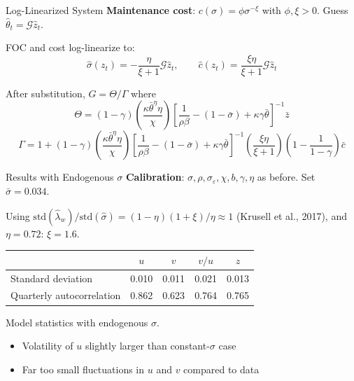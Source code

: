 \documentclass[blue]{beamer}
\begin{document}
\begin{frame}{Log-Linearized System}
	\textbf{Maintenance cost}: $c(\sigma) = \phi \sigma^{-\xi}$ with $\phi, \xi > 0$. Guess $\hat\theta_t = \mathcal{G} \hat{z}_t$.
	
	\medskip
	FOC and cost log-linearize to:
	\[
	\hat\sigma(z_t) = -\frac{\eta}{\xi + 1}\mathcal{G} \hat{z}_t, \qquad \hat{c}(z_t) = \frac{\xi \eta}{\xi + 1} \mathcal{G} \hat{z}_t
	\]
	
	\medskip
	After substitution, $G = \Theta / \Gamma$ where
	\[
	\Theta = (1 - \gamma)\!\left(\!\frac{\kappa \bar\theta^\eta \eta}{\chi}\!\right)\!\!\left[\frac{1}{\rho \beta} - (1 - \bar\sigma) + \kappa \gamma \bar\theta\right]^{-1}\! \bar{z}
	\]
	\[
	\Gamma = 1 + (1 - \gamma)\!\left(\!\frac{\kappa \bar\theta^\eta \eta}{\chi}\!\right)\!\!\left[\frac{1}{\rho \beta} - (1 - \bar\sigma) + \kappa \gamma \bar\theta\right]^{-1}\!\!\left(\!\frac{\xi \eta}{\xi + 1}\!\right)\!\!\left(\!1 - \frac{1}{1 - \gamma}\!\right)\! \bar{c}
	\]
\end{frame}

\begin{frame}{Results with Endogenous $\sigma$}
	\textbf{Calibration}: $\sigma, \rho, \sigma_\varepsilon, \chi, b, \gamma, \eta$ as before. Set $\bar\sigma = 0.034$.
	
	\bigskip
	Using $\text{std}(\hat\lambda_w) / \text{std}(\hat\sigma) = (1 - \eta)(1 + \xi)/\eta \approx 1$ (Krusell et al., 2017), and $\eta = 0.72$: $\xi = 1.6$.
	
	\begin{table}
		\centering
		\small
		\begin{tabular}{lcccc}
			\toprule
			& $u$ & $v$ & $v/u$ & $z$ \\
			\midrule
			Standard deviation & 0.010 & 0.011 & 0.021 & 0.013 \\
			Quarterly autocorrelation & 0.862 & 0.623 & 0.764 & 0.765 \\
			\bottomrule
		\end{tabular}
		
		Model statistics with endogenous $\sigma$.
	\end{table}
	
	\begin{itemize}
		\item Volatility of $u$ slightly larger than constant-$\sigma$ case
		\item Far too small fluctuations in $u$ and $v$ compared to data
	\end{itemize}
\end{frame}
\end{document}
